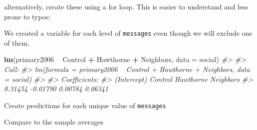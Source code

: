 \documentclass[]{book}
\newenvironment{Shaded}{\begin{snugshade}}{\end{snugshade}}
\newcommand{\CommentTok}[1]{\textcolor[rgb]{0.56,0.35,0.01}{\textit{#1}}}
\newcommand{\ControlFlowTok}[1]{\textcolor[rgb]{0.13,0.29,0.53}{\textbf{#1}}}
\newcommand{\DataTypeTok}[1]{\textcolor[rgb]{0.13,0.29,0.53}{#1}}
\newcommand{\KeywordTok}[1]{\textcolor[rgb]{0.13,0.29,0.53}{\textbf{#1}}}
\newcommand{\NormalTok}[1]{#1}
\newcommand{\OperatorTok}[1]{\textcolor[rgb]{0.81,0.36,0.00}{\textbf{#1}}}
\newcommand{\StringTok}[1]{\textcolor[rgb]{0.31,0.60,0.02}{#1}}
\theoremstyle{definition}
\theoremstyle{definition}
\theoremstyle{definition}
\theoremstyle{remark}
\begin{document}
alternatively, create these using a for loop. This is easier to
understand and less prone to typos:

\begin{Shaded}
\end{Shaded}

We created a variable for each level of \texttt{messages} even though we
will exclude one of them.

\begin{Shaded}
\begin{Highlighting}[]
\KeywordTok{lm}\NormalTok{(primary2006 }\OperatorTok{~}\StringTok{ }\NormalTok{Control }\OperatorTok{+}\StringTok{ }\NormalTok{Hawthorne }\OperatorTok{+}\StringTok{ }\NormalTok{Neighbors, }\DataTypeTok{data =}\NormalTok{ social)}
\CommentTok{#> }
\CommentTok{#> Call:}
\CommentTok{#> lm(formula = primary2006 ~ Control + Hawthorne + Neighbors, data = social)}
\CommentTok{#> }
\CommentTok{#> Coefficients:}
\CommentTok{#> (Intercept)      Control    Hawthorne    Neighbors  }
\CommentTok{#>     0.31454     -0.01790      0.00784      0.06341}
\end{Highlighting}
\end{Shaded}

Create predictions for each unique value of \texttt{messages}

\begin{Shaded}
\end{Shaded}

Compare to the sample averages

\begin{Shaded}
\end{Shaded}
\end{document}

